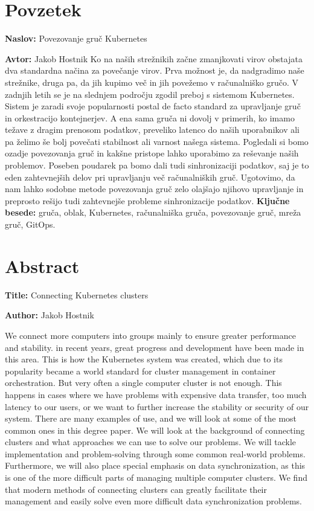 \documentclass[a4paper, 12pt]{book}
\newcommand{\ttitle}{Povezovanje gruč Kubernetes}
\newcommand{\ttitleEn}{Connecting Kubernetes clusters}
\newcommand{\tauthor}{Jakob Hostnik}
\newcommand{\tkeywords}{gruča, oblak, Kubernetes, računalniška gruča, povezovanje gruč, mreža gruč, GitOps}
\newcommand{\clearemptydoublepage}{\newpage{\pagestyle{empty}\cleardoublepage}}
\begin{document}
\chapter*{Povzetek}
\noindent\textbf{Naslov:} \ttitle
\bigskip

\noindent\textbf{Avtor:} \tauthor
\bigskip
\noindent 
Ko na naših strežnikih začne zmanjkovati virov obstajata dva standardna načina za povečanje virov.
Prva možnost je, da nadgradimo naše strežnike, druga pa, da jih kupimo več in jih povežemo v računalniško gručo.
V zadnjih letih se je na slednjem področju zgodil preboj s sistemom Kubernetes.
Sistem je zaradi svoje popularnosti postal de facto standard za upravljanje gruč in orkestracijo kontejnerjev.
A ena sama gruča ni dovolj v primerih, ko imamo težave z dragim prenosom podatkov, preveliko latenco do naših uporabnikov ali pa želimo še bolj povečati stabilnost ali varnost našega sistema.
Pogledali si bomo ozadje povezovanja gruč in kakšne pristope lahko uporabimo za reševanje naših problemov.
Poseben poudarek pa bomo dali tudi sinhronizaciji podatkov, saj je to eden zahtevnejših delov pri upravljanju več računalniških gruč.
Ugotovimo, da nam lahko sodobne metode povezovanja gruč zelo olajšajo njihovo upravljanje in preprosto rešijo tudi zahtevnejše probleme sinhronizacije podatkov.
\bigskip
\noindent\textbf{Ključne besede:} \tkeywords.
\clearemptydoublepage
\chapter*{Abstract}
\noindent\textbf{Title:} \ttitleEn
\bigskip

\noindent\textbf{Author:} \tauthor
\bigskip
\noindent 

We connect more computers into groups mainly to ensure greater performance and stability.
in recent years, great progress and development have been made in this area.
This is how the Kubernetes system was created, which due to its popularity became a world standard for cluster management in container orchestration.
But very often a single computer cluster is not enough.
This happens in cases where we have problems with expensive data transfer, too much latency to our users, or we want to further increase the stability or security of our system.
There are many examples of use, and we will look at some of the most common ones in this degree paper.
We will look at the background of connecting clusters and what approaches we can use to solve our problems.
We will tackle implementation and problem-solving through some common real-world problems.
Furthermore, we will also place special emphasis on data synchronization, as this is one of the more difficult parts of managing multiple computer clusters.
We find that modern methods of connecting clusters can greatly facilitate their management and easily solve even more difficult data synchronization problems.
\end{document}
